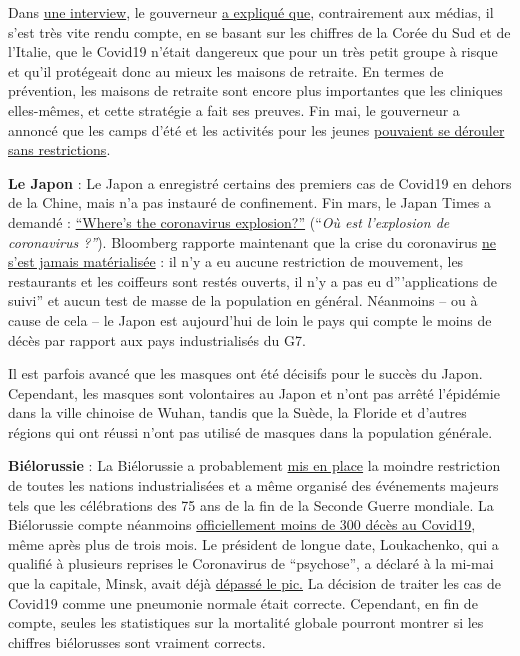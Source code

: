 Dans
\href{https://www.nationalreview.com/2020/05/coronavirus-crisis-ron-desantis-florida-covid-19-strategy/}{une
interview}, le gouverneur
\href{https://www.nationalreview.com/2020/05/coronavirus-crisis-ron-desantis-florida-covid-19-strategy/}{a
expliqué que}, contrairement aux médias, il s'est très vite rendu
compte, en se basant sur les chiffres de la Corée du Sud et de l'Italie,
que le Covid19 n'était dangereux que pour un très petit groupe à risque
et qu'il protégeait donc au mieux les maisons de retraite. En termes de
prévention, les maisons de retraite sont encore plus importantes que les
cliniques elles-mêmes, et cette stratégie a fait ses preuves. Fin mai,
le gouverneur a annoncé que les camps d'été et les activités pour les
jeunes
\href{https://www.usnews.com/news/best-states/florida/articles/2020-05-22/miami-beach-officials-agree-to-reopen-hotels-beaches-june-1}{pouvaient
se dérouler sans restrictions}.

\textbf{Le Japon} : Le Japon a enregistré certains des premiers cas de
Covid19 en dehors de la Chine, mais n'a pas instauré de confinement. Fin
mars, le Japan Times a demandé :
\href{https://www.japantimes.co.jp/news/2020/03/20/national/coronavirus-explosion-expected-japan/}{``Where's
the coronavirus explosion?''} (``\emph{Où est l'explosion de coronavirus
?''}). Bloomberg rapporte maintenant que la crise du coronavirus
\href{https://www.bloomberg.com/news/articles/2020-05-22/did-japan-just-beat-the-virus-without-lockdowns-or-mass-testing}{ne
s'est jamais matérialisée} : il n'y a eu aucune restriction de
mouvement, les restaurants et les coiffeurs sont restés ouverts, il n'y
a pas eu d'''applications de suivi'' et aucun test de masse de la
population en général. Néanmoins -- ou à cause de cela -- le Japon est
aujourd'hui de loin le pays qui compte le moins de décès par rapport aux
pays industrialisés du G7.

Il est parfois avancé que les masques ont été décisifs pour le succès du
Japon. Cependant, les masques sont volontaires au Japon et n'ont pas
arrêté l'épidémie dans la ville chinoise de Wuhan, tandis que la Suède,
la Floride et d'autres régions qui ont réussi n'ont pas utilisé de
masques dans la population générale.

\textbf{Biélorussie} : La Biélorussie a probablement
\href{https://www.youtube.com/watch?v=NZliKGoUN4E}{mis en place} la
moindre restriction de toutes les nations industrialisées et a même
organisé des événements majeurs tels que les célébrations des 75 ans de
la fin de la Seconde Guerre mondiale. La Biélorussie compte néanmoins
\href{https://en.wikipedia.org/wiki/COVID-19_pandemic_in_Belarus}{officiellement
moins de 300 décès au Covid19}, même après plus de trois mois. Le
président de longue date, Loukachenko, qui a qualifié à plusieurs
reprises le Coronavirus de ``psychose'', a déclaré à la mi-mai que la
capitale, Minsk, avait déjà
\href{https://eng.belta.by/president/view/belarus-president-coronavirus-situation-on-the-mend-130571-2020/}{dépassé
le pic.} La décision de traiter les cas de Covid19 comme une pneumonie
normale était correcte. Cependant, en fin de compte, seules les
statistiques sur la mortalité globale pourront montrer si les chiffres
biélorusses sont vraiment corrects.

